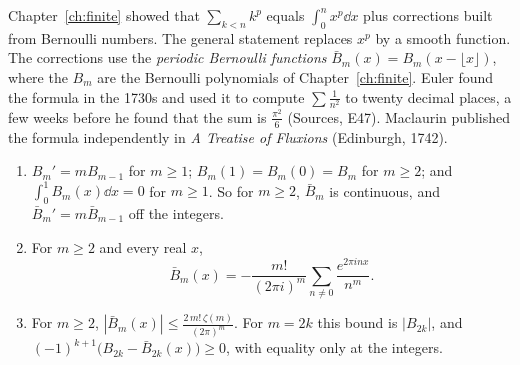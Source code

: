 Chapter~\ref{ch:finite} showed that $\sum_{k<n}k^p$ equals $\int_0^nx^p\dd x$ plus corrections built from Bernoulli numbers. The general statement replaces $x^p$ by a smooth function. The corrections use the \emph{periodic Bernoulli functions} $\bar B_m(x)=B_m(x-\lfloor x\rfloor)$, where the $B_m$ are the Bernoulli polynomials of Chapter~\ref{ch:finite}. Euler found the formula in the 1730s and used it to compute $\sum\frac1{n^2}$ to twenty decimal places, a few weeks before he found that the sum is $\frac{\pi^2}6$ (Sources, E47). Maclaurin published the formula independently in \emph{A Treatise of Fluxions} (Edinburgh, 1742).


\begin{lemma}\label{lem:bernoullifn}
\begin{enumerate}[label=(\alph*)]
\item $B_m'=mB_{m-1}$ for $m\ge1$; $B_m(1)=B_m(0)=B_m$ for $m\ge2$; and $\int_0^1B_m(x)\dd x=0$ for $m\ge1$. So for $m\ge2$, $\bar B_m$ is continuous,
and $\bar B_m'=m\bar B_{m-1}$ off the integers.
\item For $m\ge2$ and every real $x$,
\[
\bar B_m(x)=-\frac{m!}{(2\pi i)^m}\sum_{n\ne0}\frac{e^{2\pi inx}}{n^m}.
\]
\item For $m\ge2$, $|\bar B_m(x)|\le\frac{2\,m!\,\zeta(m)}{(2\pi)^m}$. For $m=2k$ this bound is $|B_{2k}|$, and $(-1)^{k+1}\bigl(B_{2k}-\bar B_{2k}(x)\bigr)\ge0$,
with equality only at the integers.
\end{enumerate}
\end{lemma}
